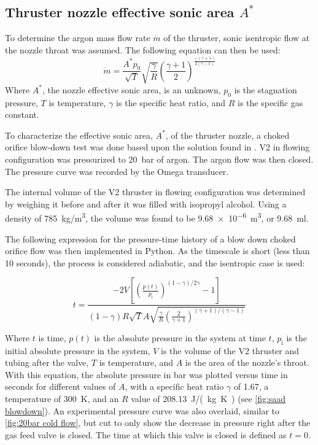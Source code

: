         \subsection{Thruster nozzle effective sonic area $A^*$}

            To determine the argon mass flow rate $\dot{m}$ of the thruster, sonic isentropic flow at the nozzle throat was assumed. The following equation can then be used:
            \begin{equation}
                \dot{m} = \frac{A^* p_0}{\sqrt{T}}\sqrt{\frac{\gamma}{R}}\left(\frac{\gamma + 1}{2}\right)^{\frac{-(\gamma + 1)}{2(\gamma-1)}}
                \label{eqn:massflow}
            \end{equation}
            Where $A^*$, the nozzle effective sonic area, is an unknown, $p_0$ is the stagnation pressure, $T$ is temperature, $\gamma$ is the specific heat ratio, and $R$ is the specific gas constant.
        
            To characterize the effective sonic area, $A^*$, of the thruster nozzle, a choked orifice blow-down test was done based upon the solution found in \textcite{saadCompressibleFluidFlow}. V2 in flowing configuration was pressurized to \qty{20}{bar} of argon. The argon flow was then closed. The pressure curve was recorded by the Omega transducer.

            The internal volume of the V2 thruster in flowing configuration was determined by weighing it before and after it was filled with isopropyl alcohol. Using a density of \qty{785}{kg/m^3}, the volume was found to be \qty{9.68e-6}{m^3}, or \qty{9.68}{ml}.

            The following expression for the pressure-time history of a blow down choked orifice flow \cite{saadCompressibleFluidFlow} was then implemented in Python. As the timescale is short (less than 10 seconds), the process is considered adiabatic, and the isentropic case is used:

            \begin{equation}
                t =  \frac{-2V \left[\left(\frac{p(t)}{p_\mathrm{i}}\right)^{(1-\gamma) / 2\gamma} -1 \right]}{(1-\gamma) R \sqrt{T} A \sqrt{\frac{\gamma}{R}\left(\frac{2}{\gamma + 1}\right)^{(\gamma+1) / (\gamma-1)}}}
            \end{equation}

            Where $t$ is time, $p(t)$ is the absolute pressure in the system at time $t$, $p_\mathrm{i}$ is the initial absolute pressure in the system, $V$ is the volume of the V2 thruster and tubing after the valve, $T$ is temperature, and $A$ is the area of the nozzle's throat. With this equation, the absolute pressure in bar was plotted versus time in seconds for different values of $A$, with a specific heat ratio $\gamma$ of 1.67, a temperature of \qty{300}{K}, and an $R$ value of \qty{208.13}{J/(kg.K)} (see \autoref{fig:saad blowdown}). An experimental pressure curve was also overlaid, similar to \autoref{fig:20bar cold flow}, but cut to only show the decrease in pressure right after the gas feed valve is closed. The time at which this valve is closed is defined as $t=0$.

